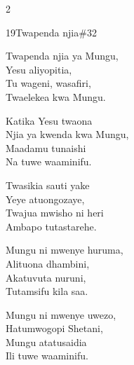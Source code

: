 \begin{multicols}{2}
\begin{hymn}{19}{Twapenda njia}{\#32}
\begin{stanza}
Twapenda njia ya Mungu,\\
Yesu aliyopitia,\\
Tu wageni, wasafiri,\\
Twaelekea kwa Mungu.
\end{stanza}
\begin{chorus}
Katika Yesu twaona\\
Njia ya kwenda kwa Mungu,\\
Maadamu tunaishi\\
Na tuwe waaminifu.
\end{chorus}
\begin{stanza}
Twasikia sauti yake\\
Yeye atuongozaye,\\
Twajua mwisho ni heri\\
Ambapo tutastarehe.
\end{stanza}
\begin{stanza}
Mungu ni mwenye huruma,\\
Alituona dhambini,\\
Akatuvuta nuruni,\\
Tutamsifu kila saa.
\end{stanza}
\begin{stanza}
Mungu ni mwenye uwezo,\\
Hatumwogopi Shetani,\\
Mungu atatusaidia\\
Ili tuwe waaminifu.
\end{stanza}
\end{hymn}


\end{multicols}
